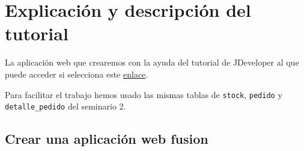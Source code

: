 \section{Explicación y descripción del tutorial}

La aplicación web que crearemos con la ayuda del tutorial de JDeveloper al que puede acceder si selecciona este \href{https://docs.oracle.com/cd/E53569_01/tutorials/tut_rich_app_alta/tut_rich_app_alta_1.html}{enlace}.

Para facilitar el trabajo hemos usado las mismas tablas de \texttt{stock}, \texttt{pedido} y \texttt{detalle\_pedido} del seminario 2.

\subsection{Crear una aplicación web fusion}

